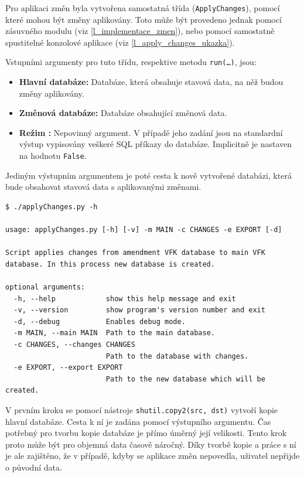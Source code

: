 \documentclass[a4paper,12pt,oneside]{book}
\begin{document}
Pro aplikaci změn byla vytvořena samostatná třída (\texttt{ApplyChanges}), pomocí které mohou být změny aplikovány. Toto může být provedeno jednak pomocí zásuvného modulu (viz \ref{l_implementace_zmen}), nebo pomocí samostatně spustitelné konzolové aplikace (viz \ref{l_apply_changes_ukazka}).

Vstupními argumenty pro tuto třídu, respektive metodu \texttt{run(\dots)}, jsou:

\begin{itemize}
 \item \textbf{Hlavní databáze:} Databáze, která obsahuje stavová data, na něž budou změny aplikovány.
 \item \textbf{Změnová databáze:} Databáze obsahující změnová data.
 \item \textbf{Režim :} Nepovinný argument. V případě jeho zadání jsou na standardní výstup vypisovány veškeré SQL příkazy do databáze. Implicitně je nastaven na hodnotu \texttt{False}.
\end{itemize}

Jediným výstupním argumentem je poté cesta k nově vytvořené databázi, která bude obsahovat stavová data s aplikovanými změnami.

\newpage
\begin{lstlisting}[caption={Nápověda ke konzolové aplikaci pro implementaci změn}, 
		    label=l_apply_changes_ukazka]
$ ./applyChanges.py -h

usage: applyChanges.py [-h] [-v] -m MAIN -c CHANGES -e EXPORT [-d]

Script applies changes from amendment VFK database to main VFK database. In this process new database is created.

optional arguments:
  -h, --help            show this help message and exit
  -v, --version         show program's version number and exit
  -d, --debug           Enables debug mode.
  -m MAIN, --main MAIN  Path to the main database.
  -c CHANGES, --changes CHANGES
                        Path to the database with changes.
  -e EXPORT, --export EXPORT
                        Path to the new database which will be created.
\end{lstlisting}

V prvním kroku se pomocí nástroje \texttt{shutil.copy2(src, dst)} vytvoří kopie hlavní databáze. Cesta k ní je zadána pomocí výstupního argumentu. Čas potřebný pro tvorbu kopie databáze je přímo úměrný její velikosti. Tento krok proto může být pro objemná data časově náročný. Díky tvorbě kopie a práce s ní je ale zajištěno, že v případě, kdyby se aplikace změn nepovedla, uživatel nepřijde o původní data.
\end{document}
